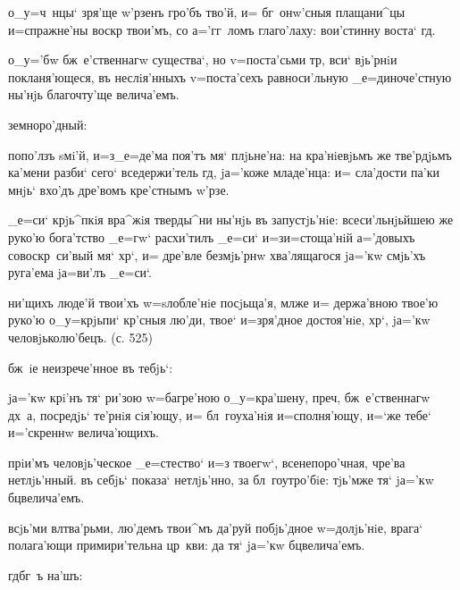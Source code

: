  о_у=ч~нцы` зря'ще w'рзенъ гро'бъ тво'й, 
и= бг~онw'сныя плащани^цы и=спражне'ны воскр 
твои'мъ, со а='гг~ломъ глаго'лаху: вои'стинну воста` 
гд.

  о_у='бw бж~е'ственнагw 
существа`, но v=поста'сьми тр, вси` вjь'рнiи 
покланя'ющеся, въ неслiя'нныхъ v=поста'сехъ равноси'льную 
_е=диноче'стную ны'нjь благочту'ще велича'емъ.

  земноро'дный:

 попо'лзъ sмi'й, и=з\ъ _е=де'ма поя'тъ 
мя` плjьне'на: на кра'нiевjьмъ же тве'рдjьмъ ка'мени 
разби` сего` вседержи'тель гд, jа='коже младе'нца: и= 
сла'дости па'ки мнjь` вхо'дъ дре'вомъ кре'стнымъ 
w'рзе.

 _е=си` крjь^пкiя вра^жiя тверды^ни 
ны'нjь въ запустjь'нiе: всеси'льнjьйшею же руко'ю 
бога'тство _е=гw` расхи'тилъ _е=си` и=з\ъ и=стоща'нiй 
а='довыхъ совоскр~си'вый мя` хр`, и= дре'вле 
безмjь'рнw хва'лящагося jа='кw смjь'хъ руга'ема jа=ви'лъ 
_е=си`.

 ни'щихъ люде'й твои'хъ w=sлобле'нiе 
посjьща'я, мл же и= держа'вною твое'ю руко'ю 
о_у=крjьпи` кр'сныя лю'ди, твое` и=зря'дное 
достоя'нiе, хр`, jа='кw человjьколю'бецъ. (с. 525)

   бж~iе неизрече'нное 
въ тебjь`:

 jа='кw крi'нъ тя` ри'зою w=багре'ною 
о_у=кра'шену, преч, бж~е'ственнагw дх~а, посредjь` 
те'рнiя сiя'ющу, и= бл~гоуха'нiя и=сполня'ющу, и=`же 
тебе` и='скреннw велича'ющихъ.

 прiи'мъ человjь'ческое _е=стество` и=з\ъ 
твоегw`, всенепоро'чная, чре'ва нетлjь'нный. въ себjь` 
показа` нетлjь'нно, за бл~гоутро'бiе: тjь'мже тя` jа='кw 
бц велича'емъ.

 всjь'ми вл тва'рьми, лю'демъ 
твои^мъ да'руй побjь'дное w=долjь'нiе, врага` полага'ющи 
примири'тельна цр~кви: да тя` jа='кw бц велича'емъ.

     гд бг~ъ 
на'шъ: 


